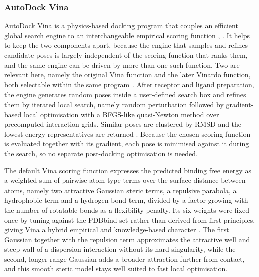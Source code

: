 \hypertarget{autodock-vina}{%
\subsubsection{AutoDock Vina}\label{autodock-vina}}

AutoDock Vina is a physics-based docking program that couples an efficient global search engine to an interchangeable empirical scoring function \cite{ref022}, \cite{ref023}. It helps to keep the two components apart, because the engine that samples and refines candidate poses is largely independent of the scoring function that ranks them, and the same engine can be driven by more than one such function. Two are relevant here, namely the original Vina function and the later Vinardo function, both selectable within the same program \cite{ref023}. After receptor and ligand preparation, the engine generates random poses inside a user-defined search box and refines them by iterated local search, namely random perturbation followed by gradient-based local optimisation with a BFGS-like quasi-Newton method over precomputed interaction grids. Similar poses are clustered by RMSD and the lowest-energy representatives are returned \cite{ref023}. Because the chosen scoring function is evaluated together with its gradient, each pose is minimised against it during the search, so no separate post-docking optimisation is needed.

The default Vina scoring function expresses the predicted binding free energy as a weighted sum of pairwise atom-type terms over the surface distance between atoms, namely two attractive Gaussian steric terms, a repulsive parabola, a hydrophobic term and a hydrogen-bond term, divided by a factor growing with the number of rotatable bonds as a flexibility penalty. Its six weights were fixed once by tuning against the PDBbind set rather than derived from first principles, giving Vina a hybrid empirical and knowledge-based character \cite{ref022}. The first Gaussian together with the repulsion term approximates the attractive well and steep wall of a dispersion interaction without its hard singularity, while the second, longer-range Gaussian adds a broader attraction further from contact, and this smooth steric model stays well suited to fast local optimisation.

